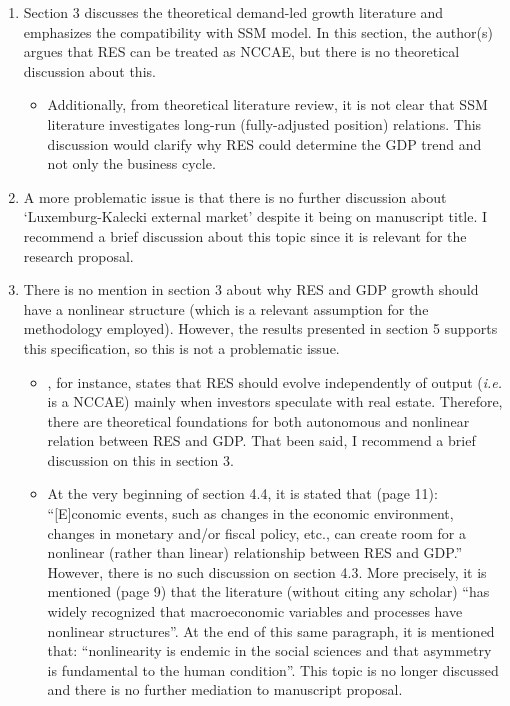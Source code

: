 \documentclass[11pt]{article}
\begin{document}
\begin{enumerate}
\item Section 3 discusses the theoretical demand-led growth literature and emphasizes the compatibility with SSM model. In this section, the author(s) argues that RES can be treated as NCCAE, but there is no theoretical discussion about this.

\begin{itemize}
\item Additionally, from theoretical literature review, it is not clear that SSM literature investigates long-run (fully-adjusted position) relations. This discussion would clarify why RES could determine the GDP trend and not only the business cycle.
\end{itemize}

\item A more problematic issue is that there is no further discussion about `Luxemburg-Kalecki external market' despite it being on manuscript title. I recommend a brief discussion about this topic since it is relevant for the research proposal.

\item There is no mention in section 3 about why RES and GDP growth should have a nonlinear structure (which is a relevant assumption for the methodology employed). However, the results presented in section 5 supports this specification, so this is not a problematic issue.

\begin{itemize}
\item \textcite{duesenberry_investment_1958}, for instance, states that RES should evolve independently of output (\emph{i.e.} is a NCCAE) mainly when investors speculate with real estate. Therefore, there are theoretical foundations for both autonomous and nonlinear relation between RES and GDP. That been said, I recommend a brief discussion on this in section 3.

\item At the very beginning of section 4.4, it is stated that (page 11): ``[E]conomic events, such as changes in the economic environment, changes in monetary and/or fiscal policy, etc., can create room for a nonlinear (rather than linear) relationship between RES and GDP.'' However, there is no such discussion on section 4.3. More precisely, it is mentioned (page 9) that the literature (without citing any scholar) ``has widely recognized that macroeconomic variables and processes have nonlinear structures''. At the end of this same paragraph, it is mentioned that: ``nonlinearity is endemic in the social sciences and that asymmetry is fundamental to the human condition''. This topic is no longer discussed and there is no further mediation to manuscript proposal.
\end{itemize}


\end{enumerate}
\end{document}
